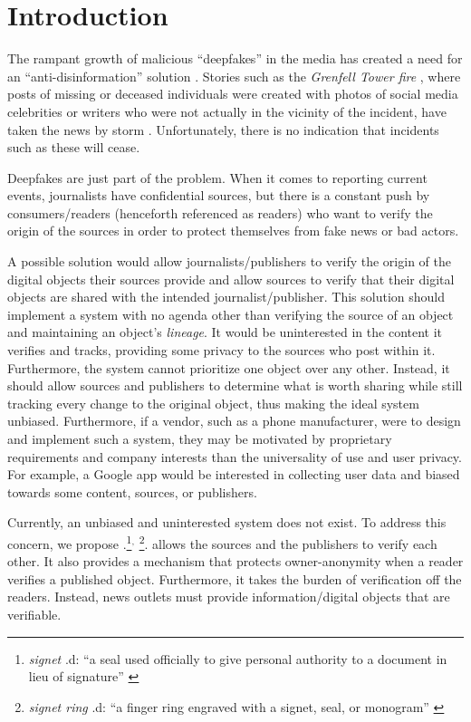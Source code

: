 \section{Introduction}
\label{sec:intro}

The rampant growth of malicious \enquote{deepfakes} in the media has created a need for an \enquote{anti-disinformation} solution \cite{ckdg20}. Stories such as the {\em Grenfell Tower fire} \cite{grenfell-wiki}, where posts of missing or deceased individuals were created with photos of social media celebrities or writers who were not actually in the vicinity of the incident, have taken the news by storm \cite{bl18}. Unfortunately, there is no indication that incidents such as these will cease.

Deepfakes are just part of the problem. When it comes to reporting current events, journalists have confidential sources, but there is a constant push by consumers/readers (henceforth referenced as readers) who want to verify the origin of the sources in order to protect themselves from fake news or bad actors.

A possible solution would allow journalists/publishers to verify the origin of the digital objects their sources provide and allow sources to verify that their digital objects are shared with the intended journalist/publisher. This solution should implement a system with no agenda other than verifying the source of an object and maintaining an object's {\em lineage}. It would be uninterested in the content it verifies and tracks, providing some privacy to the sources who post within it. Furthermore, the system cannot prioritize one object over any other. Instead, it should allow sources and publishers to determine what is worth sharing while still tracking every change to the original object, thus making the ideal system unbiased.
Furthermore, if a vendor, such as a phone manufacturer, were to design and implement such a system, they may be motivated by proprietary requirements and company interests than the universality of use and user privacy. For example, a Google app would be interested in collecting user data and biased towards some content, sources, or publishers. 

Currently, an unbiased and uninterested system does not exist. To address this concern, we propose \name.\cprotect\footnote{{\em signet} .d: \enquote{a seal used officially to give personal authority to a document in lieu of signature} \cite{mw:signet}}$^{,}$
\footnote{{\em signet ring} .d: \enquote{a finger ring engraved with a signet, seal, or monogram} \cite{mw:signet-ring}}. \name allows the sources and the publishers to verify each other. It also provides a mechanism that protects owner-anonymity when a reader verifies a published object. Furthermore, it takes the burden of verification off the readers. Instead, news outlets must provide information/digital objects that are verifiable. 

